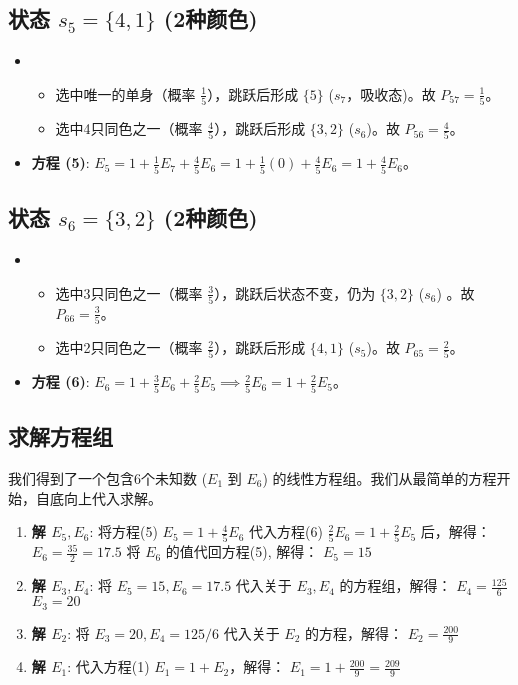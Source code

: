 \documentclass[UTF8]{ctexart}
\begin{document}
\subsection*{状态 $s_5 = \{4, 1\}$ (2种颜色)}
\begin{itemize}
    \item 
        \begin{itemize}
            \item 选中唯一的单身（概率 $\frac{1}{5}$），跳跃后形成 $\{5\}$ ($s_7$，吸收态)。故 $P_{57} = \frac{1}{5}$。
            \item 选中4只同色之一（概率 $\frac{4}{5}$），跳跃后形成 $\{3,2\}$ ($s_6$)。故 $P_{56} = \frac{4}{5}$。
        \end{itemize}
    \item \textbf{方程 (5)}: $E_5 = 1 + \frac{1}{5}E_7 + \frac{4}{5}E_6 = 1 + \frac{1}{5}(0) + \frac{4}{5}E_6 = 1 + \frac{4}{5}E_6$。
\end{itemize}

\subsection*{状态 $s_6 = \{3, 2\}$ (2种颜色)}
\begin{itemize}
    \item 
        \begin{itemize}
            \item 选中3只同色之一（概率 $\frac{3}{5}$），跳跃后状态不变，仍为 $\{3,2\}$ ($s_6$) 。故 $P_{66} = \frac{3}{5}$。
            \item 选中2只同色之一（概率 $\frac{2}{5}$），跳跃后形成 $\{4,1\}$ ($s_5$)。故 $P_{65} = \frac{2}{5}$。
        \end{itemize}
    \item \textbf{方程 (6)}: $E_6 = 1 + \frac{3}{5}E_6 + \frac{2}{5}E_5 \implies \frac{2}{5}E_6 = 1 + \frac{2}{5}E_5$。
\end{itemize}

\subsection*{求解方程组}

我们得到了一个包含6个未知数 ($E_1$ 到 $E_6$) 的线性方程组。我们从最简单的方程开始，自底向上代入求解。
\begin{enumerate}
    \item \textbf{解 $E_5, E_6$}:
    将方程(5) $E_5 = 1 + \frac{4}{5}E_6$ 代入方程(6) $\frac{2}{5}E_6 = 1 + \frac{2}{5}E_5$ 后，解得：
    $E_6 = \frac{35}{2} = 17.5$
    将 $E_6$ 的值代回方程(5), 解得：
    $E_5 = 15$

    \item \textbf{解 $E_3, E_4$}:
    将 $E_5=15, E_6=17.5$ 代入关于 $E_3, E_4$ 的方程组，解得：
    $E_4 = \frac{125}{6}$
    $E_3 = 20$

    \item \textbf{解 $E_2$}:
    将 $E_3=20, E_4=125/6$ 代入关于 $E_2$ 的方程，解得：
    $E_2 = \frac{200}{9}$

    \item \textbf{解 $E_1$}:
    代入方程(1) $E_1 = 1 + E_2$，解得：
    $E_1 = 1 + \frac{200}{9} = \frac{209}{9}$
\end{enumerate}
\end{document}
